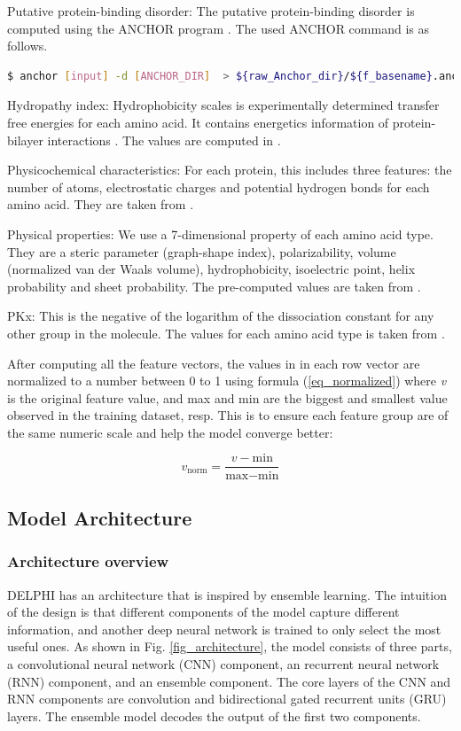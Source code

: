 Putative protein-binding disorder: The putative protein-binding disorder is computed using the ANCHOR program \cite{dosztanyi2009anchor}. The used ANCHOR command is as follows.
\begin{lstlisting}[language=bash,frame=single]
$ anchor [input] -d [ANCHOR_DIR]  > ${raw_Anchor_dir}/${f_basename}.anchor
\end{lstlisting}

Hydropathy index: Hydrophobicity scales is experimentally determined transfer free energies for each amino acid. It contains energetics information of protein-bilayer interactions \cite{wimley1996experimentally}. The values are computed in \cite{kyte1982simple}.

Physicochemical characteristics: For each protein, this includes three features: the number of atoms, electrostatic charges and potential hydrogen bonds for each amino acid. They are taken from \cite{zhang2019sequence}.

Physical properties: We use a 7-dimensional property of each amino acid type. They are a steric parameter (graph-shape index), polarizability, volume (normalized van der Waals volume), hydrophobicity, isoelectric point, helix probability and sheet probability. The pre-computed values are taken from \cite{zhang2019sequence}.

PKx: This is the negative of the logarithm of the dissociation constant for any other group in the molecule. The values for each amino acid type is taken from \cite{zhang2019sequence}.

After computing all the feature vectors, the values in in each row vector are normalized to a number between 0 to 1 using formula (\ref{eq_normalized}) where \textit{v} is the original feature value, and max and min are the biggest and smallest value observed in the training dataset, resp. This is to ensure each feature group are of the same numeric scale and help the model converge better:

\begin{equation}
v_\text{norm}=\dfrac{v-\text{min}}{\text{max}-\text{min}}\label{eq_normalized}
\end{equation}

\subsection{Model Architecture}
\subsubsection{Architecture overview}
DELPHI has an architecture that is inspired by ensemble learning. The intuition of the design is that different components of the model capture different information, and another deep neural network is trained to only select the most useful ones. As shown in Fig. \ref{fig_architecture}, the model consists of three parts, a convolutional neural network (CNN) component, an recurrent neural network (RNN) component, and an ensemble component. The core layers of the CNN and RNN components are convolution and bidirectional gated recurrent units (GRU) layers. The ensemble model decodes the output of the first two components.  

